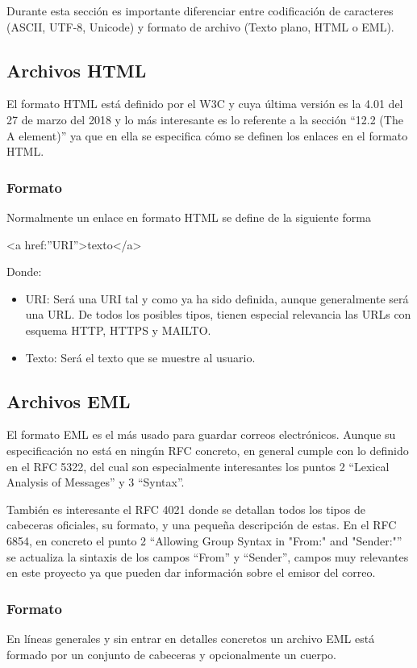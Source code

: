 Durante esta sección es importante diferenciar entre codificación de caracteres (ASCII, UTF-8, Unicode) y formato de archivo (Texto plano, HTML o EML).

\subsection{Archivos HTML}
El formato HTML está definido por el W3C y cuya última versión es la 4.01 del 27 de marzo del 2018 y lo más interesante es lo referente a la sección “12.2 (The A element)” \cite{html_a_tag} ya que en ella se especifica cómo se definen los enlaces en el formato HTML. 

\subsubsection{Formato}
Normalmente un enlace en formato HTML se define de la siguiente forma

<a href:”{URI}”>{texto}</a>

Donde: 

\begin{itemize}
    \item URI: Será una URI tal y como ya ha sido definida, aunque generalmente será una URL. De todos los posibles tipos, tienen especial relevancia las URLs con esquema HTTP, HTTPS y MAILTO.
    \item Texto: Será el texto que se muestre al usuario.
\end{itemize}

\subsection{Archivos EML}
El formato EML es el más usado para guardar correos electrónicos. Aunque su especificación no está en ningún RFC concreto, en general cumple con lo definido en el RFC 5322\cite{rfc5322}, del cual son especialmente interesantes los puntos 2 “Lexical Analysis of Messages” y 3 “Syntax”. 

También es interesante el RFC 4021\cite{rfc4021} donde se detallan todos los tipos de cabeceras oficiales, su formato, y una pequeña descripción de estas. En el RFC 6854\cite{rfc6854}, en concreto el punto 2 “Allowing Group Syntax in "From:" and "Sender:"” se actualiza la sintaxis de los campos “From” y “Sender”, campos muy relevantes en este proyecto ya que pueden dar información sobre el emisor del correo.

\subsubsection{Formato}
En líneas generales y sin entrar en detalles concretos un archivo EML está formado por un conjunto de cabeceras y opcionalmente un cuerpo. 

